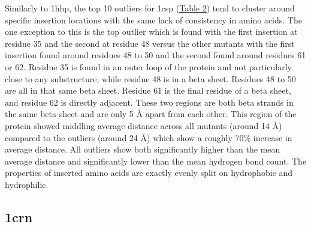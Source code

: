 \documentclass[sigconf, screen, authorversion, authoraddress=false, oneside]{acmart}
\begin{document}
Similarly to 1hhp, the top 10 outliers for 1csp (\hyperref[table:2]{Table 2}) tend to cluster around specific insertion locations with the same lack of consistency in amino acids. The one exception to this is the top outlier which is found with the first insertion at residue 35 and the second at residue 48 versus the other mutants with the first insertion found around residues 48 to 50 and the second found around residues 61 or 62. Residue 35 is found in an outer loop of the protein and not particularly close to any substructure, while residue 48 is in a beta sheet. Residues 48 to 50 are all in that same beta sheet. Residue 61 is the final residue of a beta sheet, and residue 62 is directly adjacent. These two regions are both beta strands in the same beta sheet and are only 5 Å apart from each other. This region of the protein showed middling average distance across all mutants (around 14 Å) compared to the outliers (around 24 Å) which show a roughly 70\% increase in average distance. All outliers show both significantly higher than the mean average distance and significantly lower than the mean hydrogen bond count. The properties of inserted amino acids are exactly evenly split on hydrophobic and hydrophilic.
\subsection{1crn}
\end{document}
